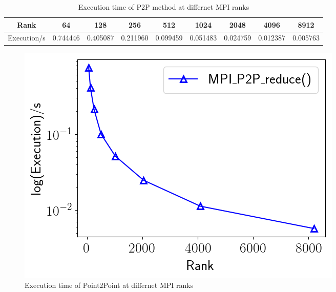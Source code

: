 \documentclass{article}
\begin{document}
\begin{table}[!htb]\centering
	\begin{tabular}{|c|c|c|c|c|c|c|c|c|}
		\hline
		Rank & 64 & 128 & 256 & 512 & 1024 & 2048 & 4096 & 8912\\
		\hline
		Execution/s & 0.744446 & 0.405087 & 0.211960 & 0.099459 & 0.051483 & 0.024759 & 0.012387 & 0.005763 \\
		\hline
	\end{tabular}
	\caption{ Execution time of P2P method at differnet MPI ranks}
\end{table}

\begin{figure}[!htb]
	\centering   
	\includegraphics[scale=0.5]{../output/p2p.png}
	\caption{ Execution time of Point2Point at differnet MPI ranks}
\end{figure}


\newpage
\end{document}
